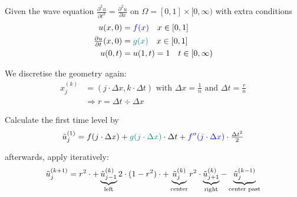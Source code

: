 
Given the wave equation $\displaystyle\frac{\partial^2 u}{\partial t^2}=\frac{\partial^2u}{\partial x}$
on $\Omega = [0,1]\times[0,\infty)$ with extra conditions
\begin{align*}
    u(x,0) & = {\color{blue} f(x)}\quad x\in[0,1] \\
    \tfrac{\partial u}{\partial t}(x,0) & = {\color{teal}g(x)}\quad x\in[0,1] \\
    u(0,t) & = u(1,t) = 1\quad t\in[0,\infty)
\end{align*}

We discretise the geometry again:
\begin{align*}
    x_{j}^{(k)} & = (j\cdot\Delta x,k\cdot\Delta t)
    \text{ with }
    \Delta x = \frac{1}{n}
    \text{ and }
    \Delta t = \frac{r}{n} \\
    & \Rightarrow r = \Delta t\div\Delta x
\end{align*}

Calculate the first time level by
\begin{align*}
{\tilde{u}}
    _{j}^{(1)} =
    f(j\cdot\Delta x)+{\color{teal}g(j\cdot\Delta x)}\cdot\Delta t+{\color{blue}f^{\prime\prime}(j\cdot\Delta x)}
    \cdot\tfrac{\Delta t^{2}}{2}
\end{align*}

afterwards, apply iteratively:
\begin{align*}
    \tilde{u}_{j}^{(k+1)} =
    r^2\cdot + \underbrace{\tilde{u}_{j-1}^{(k)}}_\text{left}
    2\cdot(1-r^{2})\cdot + \underbrace{\tilde{u}_{j}^{(k)}}_\text{center}
    r^{2}\cdot\underbrace{\tilde{u}_{j+1}^{(k)}}_\text{right} -
    \underbrace{\tilde{u}_{j}^{(k-1)}}_\text{center past}
\end{align*}

